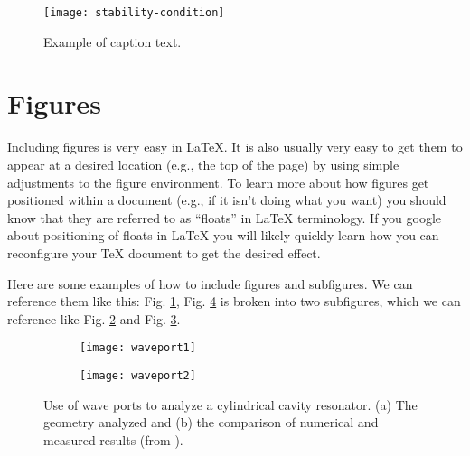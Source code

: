 \begin{figure}[t!]  
	\centering
	\texttt{[image: stability-condition]} 
	\caption{Example of caption text.}
	\label{fig:stability-condition}
\end{figure}

\section{Figures}
\label{sec:figures}
Including figures is very easy in LaTeX. It is also usually very easy to get them to appear at a desired location (e.g., the top of the page) by using simple adjustments to the figure environment. To learn more about how figures get positioned within a document (e.g., if it isn't doing what you want) you should know that they are referred to as ``floats'' in LaTeX terminology. If you google about positioning of floats in LaTeX you will likely quickly learn how you can reconfigure your TeX document to get the desired effect.

Here are some examples of how to include figures and subfigures. We can reference them like this: Fig. \ref{fig:stability-condition}, Fig. \ref{fig:waveport_ex1} is broken into two subfigures, which we can reference like Fig. \ref{subfig:waveport1} and Fig. \ref{subfig:waveport2}.

\begin{figure}[t!]
	\begin{subfigure}{0.8\linewidth} %
		\centering
		\texttt{[image: waveport1]} %
		\caption{}
		\label{subfig:waveport1}
	\end{subfigure}
	\begin{subfigure}{0.9\linewidth}
		\centering
		\texttt{[image: waveport2]} %
		\caption{} %
		\label{subfig:waveport2}
	\end{subfigure}
	\caption{Use of wave ports to analyze a cylindrical cavity resonator. (a) The geometry analyzed and (b) the comparison of numerical and measured results (from \cite{jin2011theory}).}
	\label{fig:waveport_ex1}
\end{figure}

